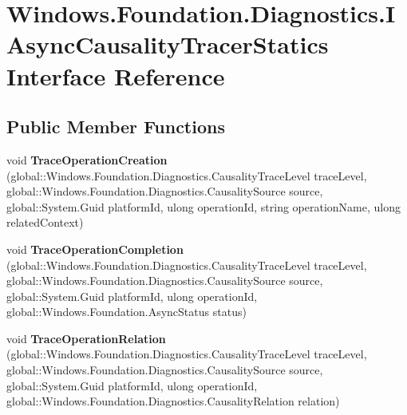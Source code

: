 \hypertarget{interface_windows_1_1_foundation_1_1_diagnostics_1_1_i_async_causality_tracer_statics}{}\section{Windows.\+Foundation.\+Diagnostics.\+I\+Async\+Causality\+Tracer\+Statics Interface Reference}
\label{interface_windows_1_1_foundation_1_1_diagnostics_1_1_i_async_causality_tracer_statics}
\subsection*{Public Member Functions}
\begin{DoxyCompactItemize}
\item 
\mbox{\label{interface_windows_1_1_foundation_1_1_diagnostics_1_1_i_async_causality_tracer_statics_a38bdec695d719f8d62636334dcfb8dc5}} 
void {\bfseries Trace\+Operation\+Creation} (global\+::\+Windows.\+Foundation.\+Diagnostics.\+Causality\+Trace\+Level trace\+Level, global\+::\+Windows.\+Foundation.\+Diagnostics.\+Causality\+Source source, global\+::\+System.\+Guid platform\+Id, ulong operation\+Id, string operation\+Name, ulong related\+Context)
\item 
\mbox{\label{interface_windows_1_1_foundation_1_1_diagnostics_1_1_i_async_causality_tracer_statics_ac5e3ac3c90be930394f03ec531d863cd}} 
void {\bfseries Trace\+Operation\+Completion} (global\+::\+Windows.\+Foundation.\+Diagnostics.\+Causality\+Trace\+Level trace\+Level, global\+::\+Windows.\+Foundation.\+Diagnostics.\+Causality\+Source source, global\+::\+System.\+Guid platform\+Id, ulong operation\+Id, global\+::\+Windows.\+Foundation.\+Async\+Status status)
\item 
\mbox{\label{interface_windows_1_1_foundation_1_1_diagnostics_1_1_i_async_causality_tracer_statics_ad69dacbb1c6dd0ede745f227c69d8d16}} 
void {\bfseries Trace\+Operation\+Relation} (global\+::\+Windows.\+Foundation.\+Diagnostics.\+Causality\+Trace\+Level trace\+Level, global\+::\+Windows.\+Foundation.\+Diagnostics.\+Causality\+Source source, global\+::\+System.\+Guid platform\+Id, ulong operation\+Id, global\+::\+Windows.\+Foundation.\+Diagnostics.\+Causality\+Relation relation)

\end{DoxyCompactItemize}

